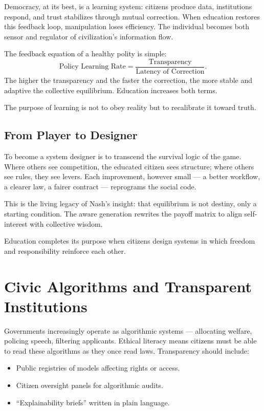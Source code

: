 \documentclass[12pt,twoside]{book}
\begin{document}
Democracy, at its best, is a learning system: citizens produce data, institutions respond, and trust stabilizes through mutual correction.  
When education restores this feedback loop, manipulation loses efficiency.  
The individual becomes both sensor and regulator of civilization’s information flow.

The feedback equation of a healthy polity is simple:
\[
\text{Policy Learning Rate} = \frac{\text{Transparency}}{\text{Latency of Correction}}.
\]
The higher the transparency and the faster the correction, the more stable and adaptive the collective equilibrium.  
Education increases both terms.\\

\begin{keyidea}
The purpose of learning is not to obey reality but to recalibrate it toward truth.
\end{keyidea}

\subsection*{From Player to Designer}

To become a system designer is to transcend the survival logic of the game.  
Where others see competition, the educated citizen sees structure; where others see rules, they see levers.  
Each improvement, however small — a better workflow, a clearer law, a fairer contract — reprograms the social code.

This is the living legacy of Nash’s insight: that equilibrium is not destiny, only a starting condition.  
The aware generation rewrites the payoff matrix to align self-interest with collective wisdom.\\

\begin{keyidea}
Education completes its purpose when citizens design systems in which freedom and responsibility reinforce each other.
\end{keyidea}

\section{Civic Algorithms and Transparent Institutions}

Governments increasingly operate as algorithmic systems — allocating welfare, policing speech, filtering applicants.  
Ethical literacy means citizens must be able to read these algorithms as they once read laws.  
Transparency should include:
\begin{itemize}
  \item Public registries of models affecting rights or access.
  \item Citizen oversight panels for algorithmic audits.
  \item “Explainability briefs” written in plain language.
\end{itemize}
\end{document}
